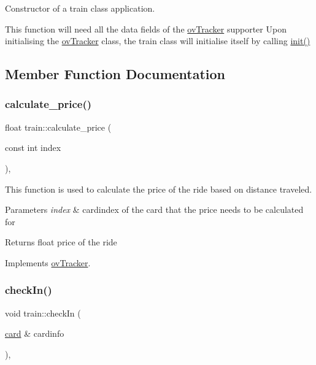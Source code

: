 Constructor of a train class application. 

This function will need all the data fields of the \hyperlink{classovTracker}{ov\+Tracker} supporter Upon initialising the \hyperlink{classovTracker}{ov\+Tracker} class, the train class will initialise itself by calling \hyperlink{classtrain_a52db26884bf0f979ad55ce92f3d2f159}{init()} 

\subsection{Member Function Documentation}
\mbox{\label{classtrain_ab027ec1ad985772fbc8b5d65a34da7be}} 
\subsubsection{\texorpdfstring{calculate\+\_\+price()}{calculate\_price()}}
{\footnotesize\ttfamily float train\+::calculate\+\_\+price (\begin{DoxyParamCaption}\item[{const int}]{index }\end{DoxyParamCaption})\hspace{0.3cm}{\ttfamily [override]}, {\ttfamily [virtual]}}



This function is used to calculate the price of the ride based on distance traveled. 


\begin{DoxyParams}{Parameters}
{\em index} & cardindex of the card that the price needs to be calculated for \\
\hline
\end{DoxyParams}
\begin{DoxyReturn}{Returns}
float price of the ride 
\end{DoxyReturn}


Implements \hyperlink{classovTracker_ad50a46fc20404df988d477f5525ae9d9}{ov\+Tracker}.

\mbox{\label{classtrain_a1e0e594fdafed4ac60b5b6d81b91c2ca}} 
\subsubsection{\texorpdfstring{check\+In()}{checkIn()}}
{\footnotesize\ttfamily void train\+::check\+In (\begin{DoxyParamCaption}\item[{\hyperlink{classcard}{card} \&}]{cardinfo }\end{DoxyParamCaption})\hspace{0.3cm}{\ttfamily [override]}, {\ttfamily [virtual]}}



